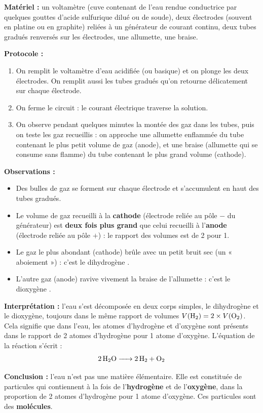 \documentclass[11pt]{article}
\newcommand{\cle}[1]{{\popxbold\color{popdark}#1}}
\begin{document}
\begin{experience}
\textbf{Matériel :} un voltamètre (cuve contenant de l'eau rendue conductrice par quelques gouttes d'acide sulfurique dilué ou de soude), deux électrodes (souvent en platine ou en graphite) reliées à un générateur de courant continu, deux tubes gradués renversés sur les électrodes, une allumette, une braise.

\textbf{Protocole :}
\begin{enumerate}
\item On remplit le voltamètre d'eau acidifiée (ou basique) et on plonge les deux électrodes. On remplit aussi les tubes gradués qu'on retourne délicatement sur chaque électrode.
\item On ferme le circuit : le courant électrique traverse la solution.
\item On observe pendant quelques minutes la montée des gaz dans les tubes, puis on teste les gaz recueillis : on approche une allumette enflammée du tube contenant le plus petit volume de gaz (anode), et une braise (allumette qui se consume sans flamme) du tube contenant le plus grand volume (cathode).
\end{enumerate}

\textbf{Observations :}
\begin{itemize}
\item Des bulles de gaz se forment sur chaque électrode et s'accumulent en haut des tubes gradués.
\item Le volume de gaz recueilli à la \textbf{cathode} (électrode reliée au pôle $-$ du générateur) est \textbf{deux fois plus grand} que celui recueilli à l'\textbf{anode} (électrode reliée au pôle $+$) : le rapport des volumes est de 2 pour 1.
\item Le gaz le plus abondant (cathode) brûle avec un petit bruit sec (un « aboiement ») : c'est le \cle{dihydrogène} .
\item L'autre gaz (anode) ravive vivement la braise de l'allumette : c'est le \cle{dioxygène} .
\end{itemize}

\textbf{Interprétation :} l'eau s'est décomposée en deux corps simples, le dihydrogène et le dioxygène, toujours dans le même rapport de volumes $V(\ce{H2}) = 2 \times V(\ce{O2})$. Cela signifie que dans l'eau, les atomes d'hydrogène et d'oxygène sont présents dans le rapport de 2 atomes d'hydrogène pour 1 atome d'oxygène. L'équation de la réaction s'écrit :
\[ \ce{2H2O -> 2H2 + O2} \]

\textbf{Conclusion :} l'eau n'est pas une matière élémentaire. Elle est constituée de particules qui contiennent à la fois de l'\textbf{hydrogène} et de l'\textbf{oxygène}, dans la proportion de 2 atomes d'hydrogène pour 1 atome d'oxygène. Ces particules sont des \textbf{molécules}.
\end{experience}
\end{document}
